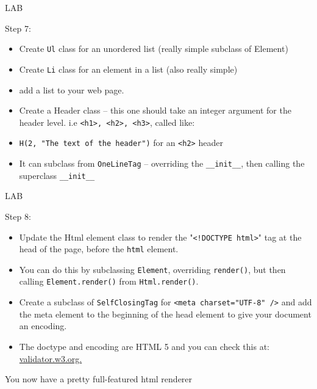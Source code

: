 \documentclass{beamer}
\begin{document}
\begin{frame}[fragile]{LAB}

{\Large Step 7:}

\begin{itemize}
   \item Create \verb|Ul| class for an unordered list (really simple subclass of Element)
   
   \item Create \verb|Li| class for an element in a list (also really simple)
   
   \item add a list to your web page.
   
   \item Create a Header class -- this one should take an integer argument for the
   header level. i.e \verb|<h1>, <h2>, <h3>|, called like:
   
   \item \verb|H(2, "The text of the header")| for an \verb|<h2>| header
   
   \item It can subclass from \verb|OneLineTag| -- overriding the \verb|__init__|, then calling
       the superclass \verb|__init__|
\end{itemize}

\end{frame}

\begin{frame}[fragile]{LAB}

{\Large Step 8:}

\begin{itemize}
   \item Update the Html element class to render the "\verb|<!DOCTYPE html>|" tag at the
   head of the page, before the \verb|html| element.
   
   \item You can do this by subclassing \verb|Element|, overriding \verb|render()|, but then
   calling \verb|Element.render()| from \verb|Html.render()|.

   \item Create a subclass of \verb|SelfClosingTag| for \verb|<meta charset="UTF-8" />|
   and add the meta element to the beginning of the head element to give your document
   an encoding.
   
   \item The doctype and encoding are HTML 5 and you can check this at:
          \url{validator.w3.org.}

\end{itemize}

\vfill
You now have a pretty full-featured html renderer
\end{frame}
\end{document}
